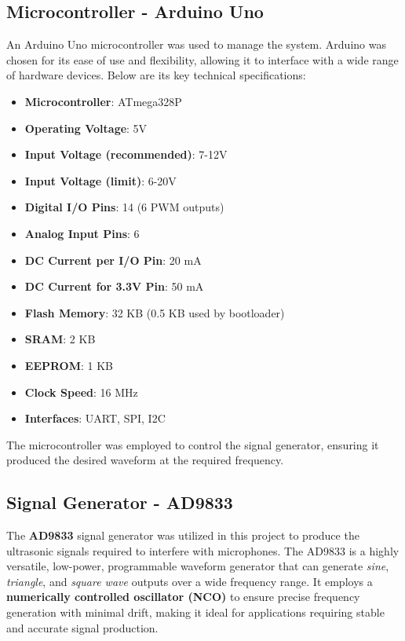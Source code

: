 \subsection{Microcontroller - Arduino Uno}
An Arduino Uno \cite{Arduino} microcontroller was used to manage the system. Arduino was chosen for its ease of use and flexibility, allowing it to interface with a wide range of hardware devices. 
Below are its key technical specifications:
\begin{itemize}
    \item \textbf{Microcontroller}: ATmega328P
    \item \textbf{Operating Voltage}: 5V
    \item \textbf{Input Voltage (recommended)}: 7-12V
    \item \textbf{Input Voltage (limit)}: 6-20V
    \item \textbf{Digital I/O Pins}: 14 (6 PWM outputs)
    \item \textbf{Analog Input Pins}: 6
    \item \textbf{DC Current per I/O Pin}: 20 mA
    \item \textbf{DC Current for 3.3V Pin}: 50 mA
    \item \textbf{Flash Memory}: 32 KB (0.5 KB used by bootloader)
    \item \textbf{SRAM}: 2 KB
    \item \textbf{EEPROM}: 1 KB
    \item \textbf{Clock Speed}: 16 MHz
    \item \textbf{Interfaces}: UART, SPI, I2C
\end{itemize}
The microcontroller was employed to control the signal generator, ensuring it produced the desired waveform at the required frequency. 

\subsection{Signal Generator - AD9833}

The \textbf{AD9833} signal generator was utilized in this project to produce the ultrasonic signals required to interfere with microphones. The AD9833 is a highly versatile, low-power, programmable waveform generator that can generate \textit{sine}, \textit{triangle}, and \textit{square wave} outputs over a wide frequency range. It employs a \textbf{numerically controlled oscillator (NCO)} to ensure precise frequency generation with minimal drift, making it ideal for applications requiring stable and accurate signal production.

